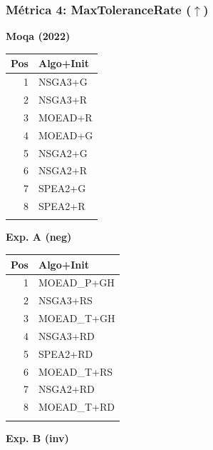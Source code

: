 \documentclass[a4paper,10pt]{article}
\begin{document}
\subsubsection{Métrica 4: MaxToleranceRate \texorpdfstring{($\uparrow$)}{(up)}}
\begin{table}[H]
    \centering
    \begin{minipage}[t]{0.32\textwidth}
        \centering\scriptsize\textbf{Moqa (2022)}\\
        \begin{tabular}{rl}
            \toprule
            Pos & Algo+Init \\ \midrule
            1 & NSGA3+G \\
            2 & NSGA3+R \\
            3 & MOEAD+R \\
            4 & MOEAD+G \\
            5 & NSGA2+G \\
            6 & NSGA2+R \\
            7 & SPEA2+G \\
            8 & SPEA2+R \\
            \\
            \bottomrule
        \end{tabular}
    \end{minipage}
    \hfill
    \begin{minipage}[t]{0.32\textwidth}
        \centering\scriptsize\textbf{Exp. A (neg)}\\
        \begin{tabular}{rl}
            \toprule
            Pos & Algo+Init \\ \midrule
            1 & MOEAD\_P+GH \\
            2 & NSGA3+RS \\
            3 & MOEAD\_T+GH \\
            4 & NSGA3+RD \\
            5 & SPEA2+RD \\
            6 & MOEAD\_T+RS \\
            7 & NSGA2+RD \\
            8 & MOEAD\_T+RD \\
            \\
            \bottomrule
        \end{tabular}
    \end{minipage}
    \hfill
    \begin{minipage}[t]{0.32\textwidth}
        \centering\scriptsize\textbf{Exp. B (inv)}\\

\end{minipage}
\end{table}
\end{document}
